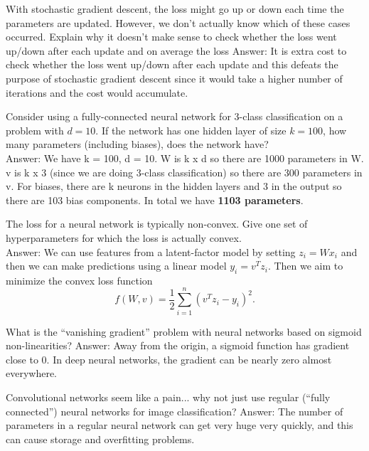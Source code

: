 \documentclass{article}
\def\gre#1{{\color{gre}#1}}
\def\ans#1{\gre{Answer: #1}}{}
\begin{document}
{\item With stochastic gradient descent, the loss might go up or down each time the parameters are updated. However, we don't actually know which of these cases occurred. Explain why it doesn't make sense to check whether the loss went up/down after each update and on average the loss 
\ans{It is extra cost to check whether the loss went up/down after each update and this defeats the purpose of stochastic gradient descent since it would take a higher number of iterations and the cost would accumulate.}
\item{Consider using a fully-connected neural network for 3-class classification on a problem with $d=10$. If the network has one hidden layer of size $k=100$, how many parameters (including biases), does the network have?} \\
\ans{We have k = 100, d = 10. W is k x d so there are 1000 parameters in W. v is k x 3 (since we are doing 3-class classification) so there are 300 parameters in v. For biases, there are k neurons in the hidden layers and 3 in the output so there are 103 bias components. In total we have \textbf{1103 parameters}.}
\item{The loss for a neural network is typically non-convex. Give one set of hyperparameters for which the loss is actually convex.} \\
\ans{We can use features from a latent-factor model by setting $z_i = Wx_i$ and then we can make predictions using a linear model $y_i = v^Tz_i$. Then we aim to minimize the convex loss function $$f(W,v) = \frac12 \sum_{i=1}^n (v^Tz_i - y_i)^2.$$}
\item What is the ``vanishing gradient'' problem with neural networks based on sigmoid non-linearities?
\ans{Away from the origin, a sigmoid function has gradient close to 0. In deep neural networks, the gradient can be nearly zero almost everywhere.}
\item{Convolutional networks seem like a pain... why not just use regular (``fully connected'') neural networks for image classification?}
\ans{The number of parameters in a regular neural network can get very huge very quickly, and this can cause storage and overfitting problems.}
}
\end{document}
